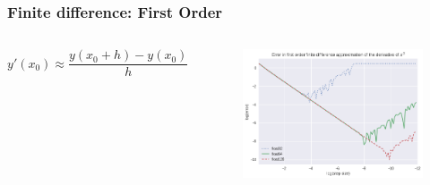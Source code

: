 \documentclass[hyperref={bookmarks=false},aspectratio=169]{beamer}
\begin{document}
\begin{frame}
  \frametitle{Finite difference: First Order}
  \begin{columns}
    \begin{equation*}
      y'(x_0)  \approx \frac{y(x_0 + h) - y(x_0)}{h}
      \label{eq:1d_1o_error}
    \end{equation*}
    \begin{figure}[hbt!]
      \centering
      \includegraphics[width=\textwidth]{images/x^3_error_order1.png}


    \end{figure}

  \end{columns}
\end{frame}
\end{document}
